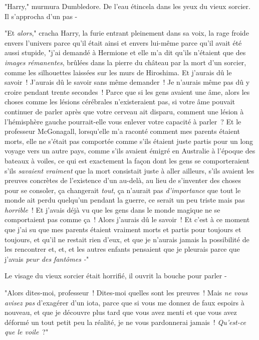 "Harry," murmura Dumbledore. De l'eau étincela dans les yeux du vieux sorcier. Il s'approcha d'un pas -

"Et \emph{alors}," cracha Harry, la furie entrant pleinement dans sa voix, la rage froide envers l'univers parce qu'il était ainsi et envers lui-même parce qu'il avait été aussi stupide, "j'ai demandé à Hermione et elle m'a dit qu'ils n'étaient que des \emph{images rémanentes}, brûlées dans la pierre du château par la mort d'un sorcier, comme les silhouettes laissées sur les murs de Hiroshima. Et j'aurais dû le savoir~! J'aurais dû le savoir sans même demander~! Je n'aurais même pas dû y croire pendant trente secondes~! Parce que si les gens avaient une âme, alors les choses comme les lésions cérébrales n'existeraient pas, si votre âme pouvait continuer de parler après que votre cerveau ait disparu, comment une lésion à l'hémisphère gauche pourrait-elle vous enlever votre capacité à parler~? Et le professeur McGonagall, lorsqu'elle m'a raconté comment mes parents étaient morts, elle ne s'était pas comportée comme s'ils étaient juste partis pour un long voyage vers un autre pays, comme s'ils avaient émigré en Australie à l'époque des bateaux à voiles, ce qui est exactement la façon dont les gens se comporteraient s'ils \emph{savaient vraiment} que la mort consistait juste à aller ailleurs, s'ils avaient les preuves concrètes de l'existence d'un au-delà, au lieu de s'inventer des choses pour se consoler, ça changerait \emph{tout}, ça n'aurait pas \emph{d'importance} que tout le monde ait perdu quelqu'un pendant la guerre, ce serait un peu triste mais pas \emph{horrible}~! Et j'avais déjà vu que les gens dans le monde magique ne se comportaient pas comme ça~! Alors j'aurais dû le savoir~! Et c'est à ce moment que j'ai su que mes parents étaient vraiment morts et partis pour toujours et toujours, et qu'il ne restait rien d'eux, et que je n'aurais jamais la possibilité de les rencontrer et, et, et les autres enfants pensaient que je pleurais parce que j'avais \emph{peur des fantômes -}"

Le visage du vieux sorcier était horrifié, il ouvrit la bouche pour parler -

"Alors dites-moi, professeur~! Dites-moi quelles sont les preuves~! Mais \emph{ne vous avisez pas} d'exagérer d'un iota, parce que si vous me donnez de faux espoirs à nouveau, et que je découvre plus tard que vous avez menti et que vous avez déformé un tout petit peu la réalité, je ne vous pardonnerai jamais~! \emph{Qu'est-ce que le voile}~?"

